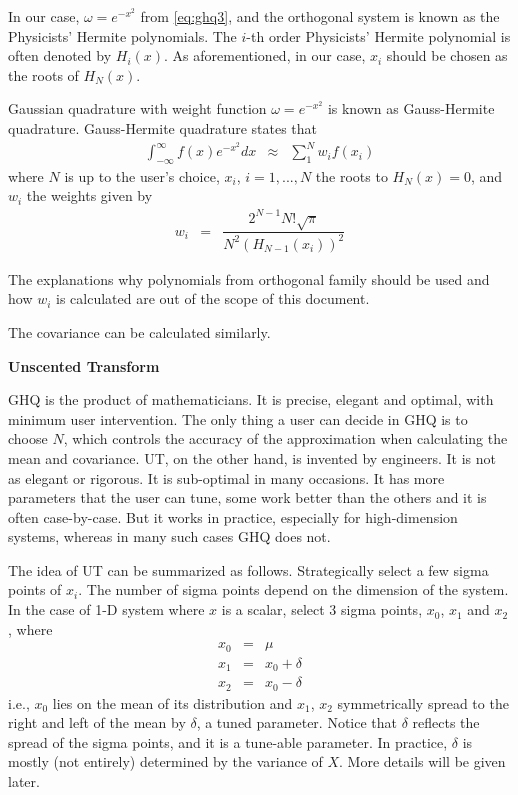 \begin{mdframed}
	In our case, $\omega = e^{-x^2}$ from \eqref{eq:ghq3}, and the orthogonal system is known as the Physicists' Hermite polynomials. The $i$-th order Physicists' Hermite polynomial is often denoted by $H_i(x)$. As aforementioned, in our case, $x_i$ should be chosen as the roots of $H_N(x)$.
	
	Gaussian quadrature with weight function $\omega = e^{-x^2}$ is known as Gauss-Hermite quadrature. Gauss-Hermite quadrature states that
	\begin{eqnarray}
		\int_{-\infty}^{\infty}f(x)e^{-x^2}dx &\approx& \sum_{1}^{N} w_if(x_i) \label{eq:ghqexp3} 
	\end{eqnarray}
	where $N$ is up to the user's choice, $x_i$, $i=1,...,N$ the roots to $H_N(x)=0$, and $w_i$ the weights given by
	\begin{eqnarray}
		w_i &=& \dfrac{2^{N-1}N!\sqrt{\pi}}{N^2\left(H_{N-1}(x_i)\right)^2} \nonumber
	\end{eqnarray}
	
	The explanations why polynomials from orthogonal family should be used and how $w_i$ is calculated are out of the scope of this document.
\end{mdframed}

The covariance can be calculated similarly.

\vspace{0.1in}
\noindent \textbf{Unscented Transform}
\vspace{0.1in}

GHQ is the product of mathematicians. It is precise, elegant and optimal, with minimum user intervention. The only thing a user can decide in GHQ is to choose $N$, which controls the accuracy of the approximation when calculating the mean and covariance. UT, on the other hand, is invented by engineers. It is not as elegant or rigorous. It is sub-optimal in many occasions. It has more parameters that the user can tune, some work better than the others and it is often case-by-case. But it works in practice, especially for high-dimension systems, whereas in many such cases GHQ does not.

The idea of UT can be summarized as follows. Strategically select a few sigma points of $x_i$. The number of sigma points depend on the dimension of the system. In the case of 1-D system where $x$ is a scalar, select 3 sigma points, $x_0$, $x_1$ and $x_2$, where
\begin{eqnarray}
	x_0 &=& \mu \nonumber \\
	x_1 &=& x_0 + \delta \nonumber \\
	x_2 &=& x_0 - \delta \nonumber
\end{eqnarray}
i.e., $x_0$ lies on the mean of its distribution and $x_1$, $x_2$ symmetrically spread to the right and left of the mean by $\delta$, a tuned parameter. Notice that $\delta$ reflects the spread of the sigma points, and it is a tune-able parameter. In practice, $\delta$ is mostly (not entirely) determined by the variance of $X$. More details will be given later.

